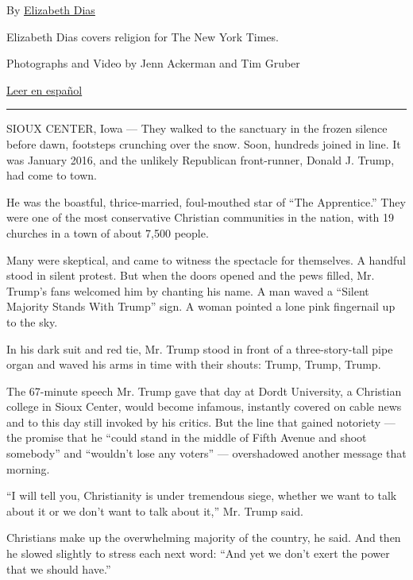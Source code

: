 By \href{https://www.nytimes3xbfgragh.onion/by/elizabeth-dias}{Elizabeth
Dias}

Elizabeth Dias covers religion for The New York Times.

Photographs and Video by Jenn Ackerman and Tim Gruber

\href{https://www.nytimes3xbfgragh.onion/es/2020/08/13/espanol/estados-unidos/trump-cristianos-evangelicos.html}{Leer
en español}

\begin{center}\rule{0.5\linewidth}{\linethickness}\end{center}

SIOUX CENTER, Iowa --- They walked to the sanctuary in the frozen
silence before dawn, footsteps crunching over the snow. Soon, hundreds
joined in line. It was January 2016, and the unlikely Republican
front-runner, Donald J. Trump, had come to town.

He was the boastful, thrice-married, foul-mouthed star of ``The
Apprentice.'' They were one of the most conservative Christian
communities in the nation, with 19 churches in a town of about 7,500
people.

Many were skeptical, and came to witness the spectacle for themselves. A
handful stood in silent protest. But when the doors opened and the pews
filled, Mr. Trump's fans welcomed him by chanting his name. A man waved
a ``Silent Majority Stands With Trump'' sign. A woman pointed a lone
pink fingernail up to the sky.

In his dark suit and red tie, Mr. Trump stood in front of a
three-story-tall pipe organ and waved his arms in time with their
shouts: Trump, Trump, Trump.

The 67-minute speech Mr. Trump gave that day at Dordt University, a
Christian college in Sioux Center, would become infamous, instantly
covered on cable news and to this day still invoked by his critics. But
the line that gained notoriety --- the promise that he ``could stand in
the middle of Fifth Avenue and shoot somebody'' and ``wouldn't lose any
voters'' --- overshadowed another message that morning.

``I will tell you, Christianity is under tremendous siege, whether we
want to talk about it or we don't want to talk about it,'' Mr. Trump
said.

Christians make up the overwhelming majority of the country, he said.
And then he slowed slightly to stress each next word: ``And yet we don't
exert the power that we should have.''

